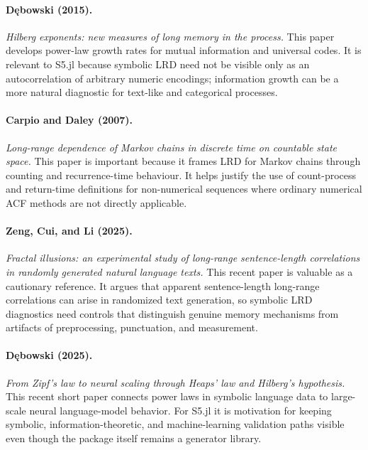 \documentclass[11pt]{article}
\begin{document}
\paragraph{Dębowski (2015).}
\emph{Hilberg exponents: new measures of long memory in the process.}
This paper develops power-law growth rates for mutual information and universal
codes. It is relevant to S5.jl because symbolic LRD need not be visible only as
an autocorrelation of arbitrary numeric encodings; information growth can be a
more natural diagnostic for text-like and categorical processes.

\paragraph{Carpio and Daley (2007).}
\emph{Long-range dependence of Markov chains in discrete time on countable state
space.}
This paper is important because it frames LRD for Markov chains through counting
and recurrence-time behaviour. It helps justify the use of count-process and
return-time definitions for non-numerical sequences where ordinary numerical ACF
methods are not directly applicable.

\paragraph{Zeng, Cui, and Li (2025).}
\emph{Fractal illusions: an experimental study of long-range sentence-length
correlations in randomly generated natural language texts.}
This recent paper is valuable as a cautionary reference. It argues that apparent
sentence-length long-range correlations can arise in randomized text generation,
so symbolic LRD diagnostics need controls that distinguish genuine memory
mechanisms from artifacts of preprocessing, punctuation, and measurement.

\paragraph{Dębowski (2025).}
\emph{From Zipf's law to neural scaling through Heaps' law and Hilberg's
hypothesis.}
This recent short paper connects power laws in symbolic language data to
large-scale neural language-model behavior. For S5.jl it is motivation for
keeping symbolic, information-theoretic, and machine-learning validation paths
visible even though the package itself remains a generator library.
\end{document}

